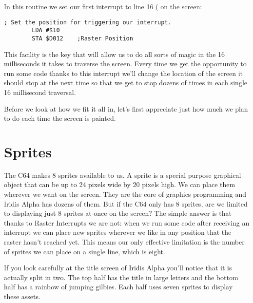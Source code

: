 In this routine we set our first interrupt to line 16 ( on the screen:

\begin{lstlisting}[caption=In \icode{InitializeSpritesAndInterruptsForTitleScreen}]
        ; Set the position for triggering our interrupt.
        LDA #$10
        STA $D012    ;Raster Position
\end{lstlisting}

This facility is the key that will allow us to do all sorts of magic in the 16 milliseconds
it takes to traverse the screen. Every time we get the opportunity to run some code thanks
to this interrupt we'll change the location of the screen it should stop at the next time
so that we get to stop dozens of times in each single 16 millisecond traversal.

Before we look at how we fit it all in, let's first appreciate just how much we plan to
do each time the screen is painted.

\section{Sprites}
The C64 makes 8 sprites available to us. A sprite is a special purpose graphical object that
can be up to 24 pixels wide by 20 pixels high. We can place them wherever we want on the
screen. They are the core of graphics programming and Iridis Alpha has dozens of them. But
if the C64 only has 8 sprites, are we limited to displaying just 8 sprites at once on the
screen? The simple answer is that thanks to Raster Interrupts we are not: when we run
some code after receiving an interrupt we can place new sprites wherever we like in any
position that the raster hasn't reached yet. This means our only effective limitation is
the number of sprites we can place on a single line, which is eight. 

If you look carefully at the title screen of Iridis Alpha you'll notice that it is actually
split in two. The top half has the title in large letters and the bottom half has a rainbow
of jumping gilbies. Each half uses seven sprites to display these assets.


